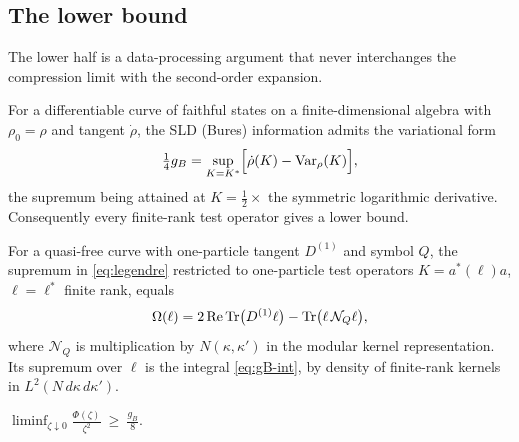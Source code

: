 \subsection{The lower bound}
The lower half is a data-processing argument that never interchanges the
compression limit with the second-order expansion.

\begin{lemma}\label{lem:legendre}
For a differentiable curve of faithful states on a finite-dimensional algebra with
$\rho_0=\rho$ and tangent $\dot\rho$, the SLD (Bures) information admits the
variational form
\begin{equation}\label{eq:legendre}
 \tfrac14 g_B=\sup_{K=K^*}\Bigl[\dot\rho(K)-\operatorname{Var}_\rho(K)\Bigr],
\end{equation}
the supremum being attained at $K=\frac12\times$ the symmetric logarithmic
derivative.  Consequently every finite-rank test operator gives a lower bound.
\end{lemma}

\begin{proposition}\label{prop:oneparticle}
For a quasi-free curve with one-particle tangent $D^{(1)}$ and symbol $Q$,
the supremum in \eqref{eq:legendre} restricted to one-particle test operators
$K=a^*(\ell)a$, $\ell=\ell^*$ finite rank, equals
\begin{equation}\label{eq:Omega-ell}
 \Omega(\ell)=2\operatorname{Re}\operatorname{Tr}\bigl(D^{(1)}\ell\bigr)
 -\operatorname{Tr}\bigl(\ell\,\mathcal N_Q\ell\bigr),
\end{equation}
where $\mathcal N_Q$ is multiplication by $N(\kappa,\kappa')$ in the modular
kernel representation.  Its supremum over $\ell$ is the integral
\eqref{eq:gB-int}, by density of finite-rank kernels in
$L^2(N\,d\kappa\,d\kappa')$.
\end{proposition}

\begin{theorem}\label{thm:lower}
$\displaystyle
 \liminf_{\zeta\downarrow0}\frac{\Phi(\zeta)}{\zeta^2}\ \ge\ \frac{g_B}8 .$
\end{theorem}

